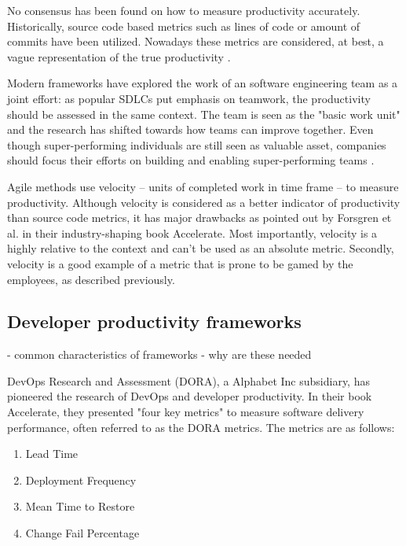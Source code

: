 No consensus has been found on how to measure productivity accurately. Historically, source code based metrics such as lines of code or amount of commits have been utilized\cite{oliveira_code_2020}. Nowadays these metrics are considered, at best, a vague representation of the true productivity \cite{forsgren_space_2021}.

Modern frameworks have explored the work of an software engineering team as a joint effort: as popular SDLCs put emphasis on teamwork, the productivity should be assessed in the same context. The team is seen as the "basic work unit" \cite{moe_overcoming_2010} and the research has shifted towards how teams can improve together. Even though super-performing individuals are still seen as valuable asset, companies should focus their efforts on building and enabling super-performing teams \cite{forsgren_space_2021}. 

Agile methods use velocity – units of completed work in time frame – to measure productivity. Although velocity is considered as a better indicator of productivity than source code metrics, it has major drawbacks as pointed out by Forsgren et al. in their industry-shaping book Accelerate. Most importantly, velocity is a highly relative to the context and can't be used as an absolute metric. Secondly, velocity is a good example of a metric that is prone to be gamed by the employees, as described previously.\cite{forsgren_accelerate_2018}
 
\subsection{Developer productivity frameworks}

- common characteristics of frameworks
- why are these needed


DevOps Research and Assessment (DORA), a Alphabet Inc subsidiary, has pioneered the research of DevOps and developer productivity. In their book Accelerate, they presented "four key metrics" to measure software delivery performance, often referred to as the DORA metrics. The metrics are as follows: 

\begin{enumerate}
\item Lead Time
\item Deployment Frequency
\item Mean Time to Restore
\item Change Fail Percentage
\end{enumerate}

